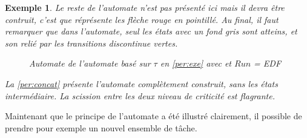 \documentclass[12pt,a4paper,oneside]{book}
\theoremstyle{break}
\newtheorem{exem}{Exemple}[chapter]
\theoremstyle{breakplain}
\begin{document}
\begin{exem}
Le reste de l'automate n'est pas présenté ici mais il devra être contruit, c'est que réprésente les flèche rouge en pointillé. Au final, il faut remarquer que dans l'automate, seul les états avec un fond gris sont atteins, et son relié par les transitions discontinue vertes.

\begin{figure}[h]

    \centering
    \def\svgwidth{\columnwidth}
    
    
\caption{Automate de l'automate basé sur $\tau$ en \autoref{per:exe} avec et $Run$ = EDF}
\label{per:concat}

\end{figure}

La \autoref{per:concat} présente l'automate complètement construit, sans les états intermédiaire. La scission entre les deux niveau de criticité est flagrante.

\end{exem}

Maintenant que le principe de l'automate a été illustré clairement, il possible de prendre pour exemple un nouvel ensemble de tâche.
\end{document}
